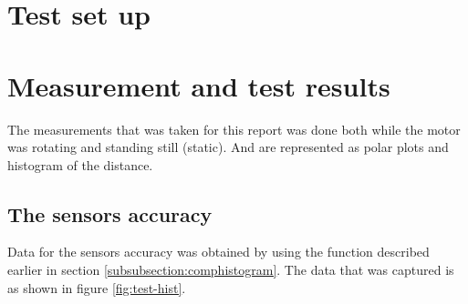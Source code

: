 
\section{Test set up}\label{section:testSetUp}


\section{Measurement and test results}\label{secition:results}
The measurements that was taken for this report was done both while the motor was rotating and standing still (static). And are represented as polar plots and histogram of the distance.



\subsection{The sensors accuracy}\label{subsubsection:accuracy}
Data for the sensors accuracy was obtained by using the function described earlier in section \ref{subsubsection:comphistogram}. The data that was captured is as shown in figure \ref{fig:test-hist}.

